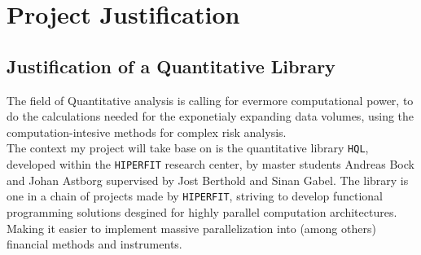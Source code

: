 \documentclass{article}
\newcommand{\HF}{\texttt{HIPERFIT}}
\newcommand{\HQL}{\texttt{HQL}}
\begin{document}
\section{Project Justification}

\subsection{Justification of a Quantitative Library}
The field of Quantitative analysis is calling for evermore computational power, to
do the calculations needed for the exponetialy expanding data volumes, using the 
computation-intesive methods for complex risk analysis.\\
The context my project will take base on is the quantitative library \HQL\cite{HQL},
developed within the \HF\cite{HF} research center, by master students Andreas Bock 
and Johan Astborg supervised by Jost Berthold and Sinan Gabel. 
The library is one in a chain of projects made by \HF, striving to develop 
functional programming solutions desgined for highly parallel computation architectures.
Making it easier to implement massive parallelization into (among others) financial 
methods and instruments\cite{FHPH}.
\end{document}
